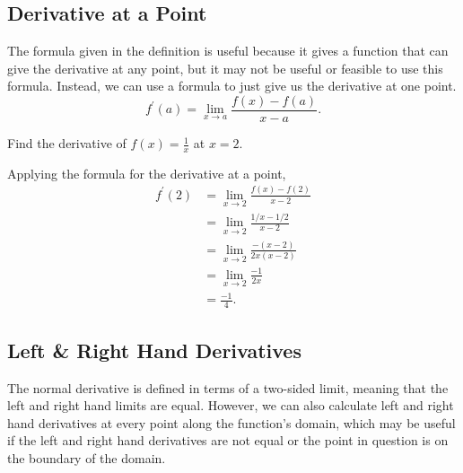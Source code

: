 \subsection{Derivative at a Point}
The formula given in the definition is useful because it gives a function that can give the derivative at any point, but it may not be useful or feasible to use this formula.
Instead, we can use a formula to just give us the derivative at one point.
\begin{equation}
	f^\prime(a) = \lim_{x \to a}{\frac{f(x)-f(a)}{x-a}}.
\end{equation}

\begin{example}
	Find the derivative of $f(x) = \frac{1}{x}$ at $x=2$.
\end{example}
Applying the formula for the derivative at a point,
\begin{align*}
	f^\prime(2) &= \lim_{x \to 2}{\frac{f(x)-f(2)}{x-2}} \\
	&= \lim_{x \to 2}{\frac{1/x - 1/2}{x-2}} \\
	& = \lim_{x \to 2}{\frac{-(x-2)}{2x(x-2)}} \\
	&= \lim_{x \to 2}{\frac{-1}{2x}} \\
	&= \frac{-1}{4}.
\end{align*}

\subsection{Left \& Right Hand Derivatives}
The normal derivative is defined in terms of a two-sided limit, meaning that the left and right hand limits are equal.
However, we can also calculate left and right hand derivatives at every point along the function's domain, which may be useful if the left and right hand derivatives are not equal or the point in question is on the boundary of the domain.

